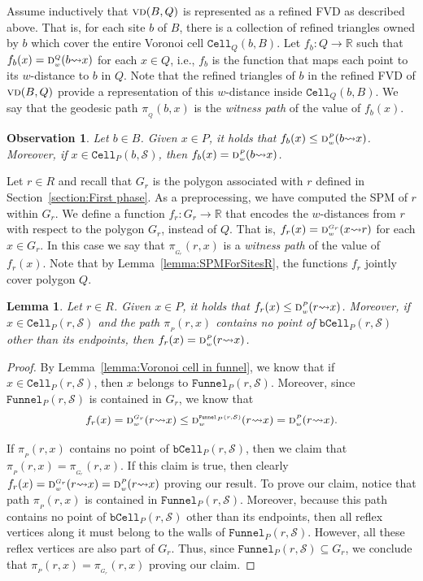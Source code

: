 \documentclass[a4paper, 11pt]{article}
\newtheorem{lemma}[theorem]{Lemma}
\newtheorem{observation}[theorem]{Observation}
\newcommand{\s}{\mathcal S}
\newcommand{\dd}[3][P]{\ensuremath{\textsc{d}_{\scriptscriptstyle w}^{\scriptscriptstyle #1}(#2 {\leadsto} #3)}}
\newcommand{\p}[3][P]{\ensuremath{\pi_{_{#1}}(#2, #3)}}
\newcommand{\funnel}[2][P]{\ensuremath{\mathtt{Funnel}_{\scriptscriptstyle #1}(#2)}}
\newcommand{\cell}[2][P]{\ensuremath{\mathtt{Cell}_{\scriptscriptstyle #1}(#2)}}
\newcommand{\bcell}[2][P]{\ensuremath{\mathtt{bCell}_{\scriptscriptstyle #1}(#2)}}
\newcommand{\vd}[2][P]{\textsc{vd}(#2, #1)}
\begin{document}
Assume inductively that $\vd[Q]{B}$ is represented as a refined FVD as described above.
That is, for each site $b$ of $B$, there is a collection of refined triangles owned by $b$ which cover the entire Voronoi cell $\cell[Q]{b, B}$. 
Let $f_b:Q \to \mathbb{R}$ such that $f_b(x) = \dd[Q]{b}{x}$ for each $x\in Q$, i.e., $f_b$ is the function that maps each point to its $w$-distance to $b$ in $Q$. 
Note that the refined triangles of $b$ in the refined FVD of $\vd[Q]{B}$ provide a representation of this $w$-distance inside $\cell[Q]{b, B}$.
We say that the geodesic path $\p[Q]{b}{x}$ is the \emph{witness path} of the value of $f_b(x)$.

\begin{observation}\label{obs: f_s and distance coincide in cell}
Let $b\in B$.
Given $x\in P$, it holds that $f_b(x) \leq \dd{b}{x}$. Moreover, if $x\in \cell{b, \s}$, then $f_b(x) = \dd{b}{x}$. 
\end{observation}

Let $r\in R$ and recall that $G_r$ is the polygon associated with $r$ defined in Section~\ref{section:First phase}. 
As a preprocessing, we have computed the SPM of $r$ within $G_r$.
We define a function $f_r:G_r\to \mathbb{R}$ that encodes the $w$-distances from $r$ with respect to the polygon $G_r$, instead of $Q$. 
That is, $f_r(x) = \dd[G_r]{x}{r}$ for each $x\in G_r$.
In this case we say that $\p[G_r]{r}{x}$ is a \emph{witness path} of the value of $f_r(x)$. 
Note that by Lemma~\ref{lemma:SPMForSitesR}, the functions $f_r$ jointly cover polygon $Q$. 

\begin{lemma}\label{lemma: f_r and distance coincide in cell}
Let $r\in R$.
Given $x\in P$, it holds that $f_r(x) \leq \dd{r}{x}$. Moreover, if $x\in \cell{r, \s}$ and the path $\p{r}{x}$ contains no point of $\bcell{r, \s}$ other than its endpoints, then $f_r(x) = \dd{r}{x}$. 
\end{lemma}
\begin{proof}
By Lemma~\ref{lemma:Voronoi cell in funnel}, we know that if $x\in \cell{r,\s}$, then  $x$ belongs to $\funnel{r, \s}$.
Moreover, since $\funnel{r, \s}$ is contained in $G_r$, we know that 
\[ f_r(x) = \dd[G_r]{r}{x} \leq \dd[\funnel{r, \s}]{r}{x} = \dd{r}{x}.\]

If $\p{r}{x}$ contains no point of $\bcell{r, \s}$, then we claim that $\p{r}{x} = \p[G_r]{r}{x}$. 
If this claim is true, then clearly $f_r(x) = \dd[G_r]{r}{x} = \dd{r}{x}$ proving our result.
To prove our claim, notice that path $\p{r}{x}$ is contained in $\funnel{r, \s}$. Moreover, because this path contains no point of $\bcell{r, \s}$ other than its endpoints, then all reflex vertices along it must belong to the walls of $\funnel{r, \s}$. However, all these reflex vertices are also part of $G_r$. Thus, since $\funnel{r, \s}\subseteq G_r$, we conclude that $\p{r}{x} = \p[G_r]{r}{x}$ proving our claim.  
\end{proof}
\end{document}
